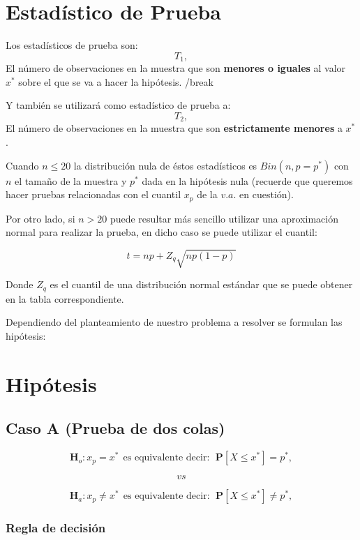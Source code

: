 \documentclass[
  a4paper,
  oneside,
  openany]{book}
\begin{document}
\hypertarget{estaduxedstico-de-prueba-1}{%
\section{Estadístico de Prueba}\label{estaduxedstico-de-prueba-1}}

Los estadísticos de prueba son:
\[T_{1},\]
El número de observaciones en la muestra que son \textbf{menores o iguales} al valor \(x^*\) sobre el que se va a hacer la hipótesis.
/break

Y también se utilizará como estadístico de prueba a:
\[T_{2},\]
El número de observaciones en la muestra que son \textbf{estrictamente menores} a \(x^*\).

Cuando \(n\leq 20\) la distribución nula de éstos estadísticos es \(Bin(n,p=p^*)\) con \(n\) el tamaño de la muestra y \(p^*\) dada en la hipótesis nula (recuerde que queremos hacer pruebas relacionadas con el cuantil \(x_{p}\) de la \(v.a.\) en cuestión).

Por otro lado, si \(n>20\) puede resultar más sencillo utilizar una aproximación normal para realizar la prueba, en dicho caso se puede utilizar el cuantil:

\[
t=np+Z_{q}\sqrt{np(1-p)}
\]

Donde \(Z_{q}\) es el cuantil de una distribución normal estándar que se puede obtener en la tabla correspondiente.

Dependiendo del planteamiento de nuestro problema a resolver se formulan las hipótesis:

\hypertarget{hipuxf3tesis-1}{%
\section{Hipótesis}\label{hipuxf3tesis-1}}

\hypertarget{caso-a-prueba-de-dos-colas-1}{%
\subsection*{Caso A (Prueba de dos colas)}\label{caso-a-prueba-de-dos-colas-1}}


\[\textbf{H}_{o}: x_{p} = x^* \ \ \mbox{es equivalente  decir}: \ \ \mathbf{P}[X \leq x^*]= p^*,\]

\[vs\]

\[\textbf{H}_a: x_{p} \neq x^* \ \ \mbox{es equivalente  decir}: \ \ \mathbf{P}[X \leq x^*]\neq p^*,\]

\hypertarget{regla-de-decisiuxf3n-3}{%
\subsubsection*{Regla de decisión}\label{regla-de-decisiuxf3n-3}}
\end{document}
